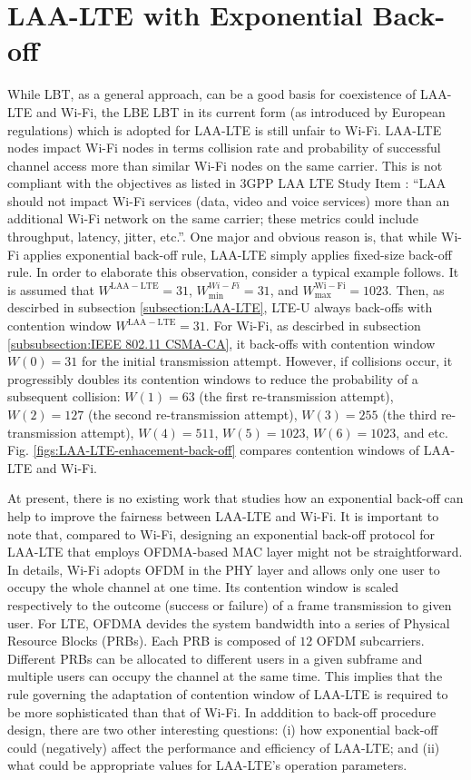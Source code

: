 \section{LAA-LTE with Exponential Back-off}
\label{subsection:exp-back-off}

While LBT, as a general approach, can be a good basis for coexistence of LAA-LTE and Wi-Fi, the LBE LBT in its current form (as introduced by European regulations) which is adopted for LAA-LTE is still unfair to Wi-Fi. LAA-LTE nodes impact Wi-Fi nodes in terms collision rate and probability of successful channel access more than similar Wi-Fi nodes on the same carrier. This is not compliant with the objectives as listed in 3GPP LAA LTE Study Item \cite{LAA-LTE-SI}: ``LAA should not impact Wi-Fi services (data, video and voice services) more than an additional Wi-Fi network on the same carrier; these metrics could include throughput, latency, jitter, etc.''. One major and obvious reason is, that while Wi-Fi applies exponential back-off rule, LAA-LTE simply applies fixed-size back-off rule. In order to elaborate this observation, consider a typical example follows. It is assumed that $W^{\mathrm{LAA-LTE}}=31$, $W^{Wi-Fi}_{\min}=31$, and $W^{\mathrm{Wi-Fi}}_{\max}=1023$. Then, as descirbed in subsection \ref{subsection:LAA-LTE}, LTE-U always back-offs with contention window $W^{\mathrm{LAA-LTE}}=31$. For Wi-Fi, as descirbed in subsection \ref{subsubsection:IEEE 802.11 CSMA-CA}, it back-offs with contention window $W(0)=31$ for the initial transmission attempt. However, if collisions occur, it progressibly doubles its contention windows to reduce the probability of a subsequent collision: $W(1)=63$ (the first re-transmission attempt), $W(2)=127$ (the second re-transmission attempt), $W(3)=255$ (the third re-transmission attempt), $W(4)=511$, $W(5)=1023$, $W(6)=1023$, and etc. Fig. \ref{figs:LAA-LTE-enhacement-back-off} compares contention windows of LAA-LTE and Wi-Fi.

At present, there is no existing work that studies how an exponential back-off can help to improve the fairness between LAA-LTE and Wi-Fi. It is important to note that, compared to Wi-Fi, designing an exponential back-off protocol for LAA-LTE that employs OFDMA-based MAC layer might not be straightforward. In details, Wi-Fi adopts OFDM in the PHY layer and allows only one user to occupy the whole channel at one time. Its contention window is scaled respectively to the outcome (success or failure) of a frame transmission to given user. For LTE, OFDMA devides the system bandwidth into a series of Physical Resource Blocks (PRBs). Each PRB is composed of $12$ OFDM subcarriers. Different PRBs can be allocated to different users in a given subframe and multiple users can occupy the channel at the same time. This implies that the rule governing the adaptation of contention window of LAA-LTE is required to be more sophisticated than that of Wi-Fi. In adddition to back-off procedure design, there are two other interesting questions: (i) how exponential back-off could (negatively) affect the performance and efficiency of LAA-LTE; and (ii) what could be appropriate values for LAA-LTE's operation parameters.

